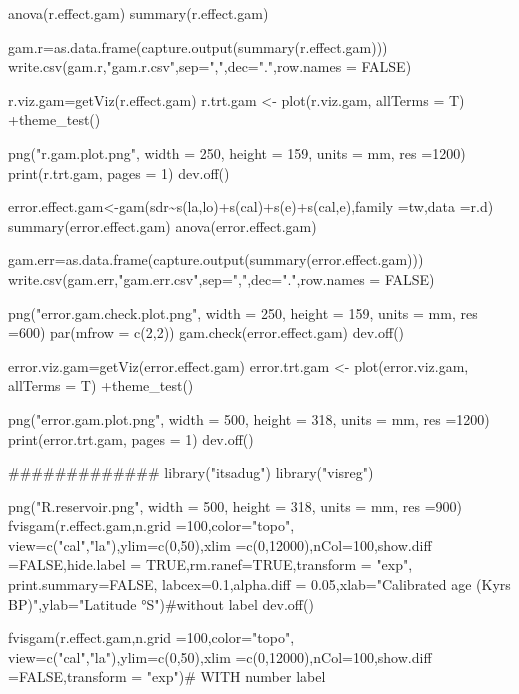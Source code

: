 \documentclass[
]{article}
\newenvironment{Shaded}{\begin{snugshade}}{\end{snugshade}}
\newcommand{\NormalTok}[1]{#1}
\begin{document}
\begin{Shaded}
\begin{Highlighting}[]
\NormalTok{anova(r.effect.gam)}
\NormalTok{summary(r.effect.gam)}

\NormalTok{gam.r=as.data.frame(capture.output(summary(r.effect.gam)))}
\NormalTok{write.csv(gam.r,"gam.r.csv",sep=",",dec=".",row.names = FALSE)}

\NormalTok{r.viz.gam=getViz(r.effect.gam)}
\NormalTok{r.trt.gam \textless{}{-} plot(r.viz.gam, allTerms = T) +theme\_test()}

\NormalTok{png("r.gam.plot.png", width = 250, height = 159, units = \textquotesingle{}mm\textquotesingle{}, res =1200)}
\NormalTok{print(r.trt.gam, pages = 1)}
\NormalTok{dev.off()}

\NormalTok{error.effect.gam\textless{}{-}gam(sdr\textasciitilde{}s(la,lo)+s(cal)+s(e)+s(cal,e),family =tw,data =r.d)}
\NormalTok{summary(error.effect.gam)}
\NormalTok{anova(error.effect.gam)}

\NormalTok{gam.err=as.data.frame(capture.output(summary(error.effect.gam)))}
\NormalTok{write.csv(gam.err,"gam.err.csv",sep=",",dec=".",row.names = FALSE)}

\NormalTok{png("error.gam.check.plot.png", width = 250, height = 159, units = \textquotesingle{}mm\textquotesingle{}, res =600)}
\NormalTok{par(mfrow = c(2,2))}
\NormalTok{gam.check(error.effect.gam)}
\NormalTok{dev.off()}

\NormalTok{error.viz.gam=getViz(error.effect.gam)}
\NormalTok{error.trt.gam \textless{}{-} plot(error.viz.gam, allTerms = T) +theme\_test()}

\NormalTok{png("error.gam.plot.png", width = 500, height = 318, units = \textquotesingle{}mm\textquotesingle{}, res =1200)}
\NormalTok{print(error.trt.gam, pages = 1)}
\NormalTok{dev.off()}

\NormalTok{\#\#\#\#\#\#\#\#\#\#\#\#\#}
\NormalTok{library("itsadug")}
\NormalTok{library("visreg")}

\NormalTok{png("R.reservoir.png", width = 500, height = 318, units = \textquotesingle{}mm\textquotesingle{}, res =900)}
\NormalTok{fvisgam(r.effect.gam,n.grid =100,color="topo", view=c("cal","la"),ylim=c(0,50),xlim =c(0,12000),nCol=100,show.diff =FALSE,hide.label = TRUE,rm.ranef=TRUE,transform = "exp", print.summary=FALSE, labcex=0.1,alpha.diff = 0.05,xlab="Calibrated age (Kyrs BP)",ylab="Latitude °S")\#without label}
\NormalTok{dev.off()}

\NormalTok{fvisgam(r.effect.gam,n.grid =100,color="topo", view=c("cal","la"),ylim=c(0,50),xlim =c(0,12000),nCol=100,show.diff =FALSE,transform = "exp")\# WITH number label}


\end{Highlighting}
\end{Shaded}
\end{document}

